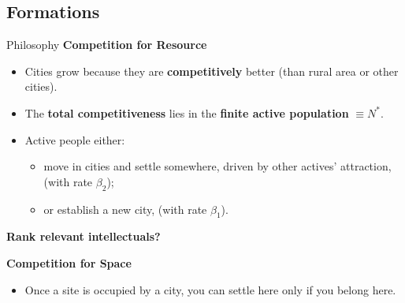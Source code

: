 \subsection{Formations}
\begin{frame}{Philosophy}
\textbf{Competition for Resource}
    \begin{itemize}
        \item Cities grow because they are \textbf{competitively} better (than rural area or other cities).
        \item The \textbf{total competitiveness} lies in the \textbf{finite active population} $\equiv N^*$.
        \item Active people either:
        \begin{itemize}
            \item move in cities and settle somewhere, driven by other actives' attraction, (with rate $\beta_2$);
            \item or establish a new city, (with rate $\beta_1$).
        \end{itemize}
    \end{itemize}
    \begin{center}
        \textbf{Rank relevant intellectuals?}
    \end{center}
\textbf{Competition for Space}
    \begin{itemize}
        \item Once a site is occupied by a city, you can settle here only if you belong here.
    \end{itemize}
\end{frame}


